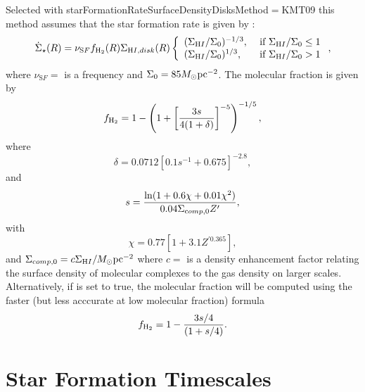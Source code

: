 Selected with {\normalfont \ttfamily starFormationRateSurfaceDensityDisksMethod}$=${\normalfont \ttfamily KMT09} this method assumes that the star formation rate is given by \citep{krumholz_star_2009}:
\begin{equation}
 \dot{\Sigma}_\star(R) = \nu_{\mathrm SF} f_{\mathrm H_2}(R)\Sigma_{\mathrm HI, disk}(R) \left\{ \begin{array}{ll} (\Sigma_{\mathrm HI}/\Sigma_0)^{-1/3}, &  \hbox{ if } \Sigma_{\mathrm HI}/\Sigma_0 \le 1 \\ (\Sigma_{\mathrm HI}/\Sigma_0)^{1/3}, & \hbox{ if } \Sigma_{\mathrm HI}/\Sigma_0 > 1 \end{array} \right. ,
\end{equation}
where $\nu_{\mathrm SF}=${\normalfont \ttfamily [starFormationFrequencyKMT09]} is a frequency and $\Sigma_0=85 M_\odot \hbox{pc}^{-2}$. The molecular fraction is given by
\begin{equation}
 f_{\mathrm H_2} = 1 - \left( 1 + \left[ { 3 s \over 4 (1+\delta)} \right]^{-5} \right)^{-1/5},
\end{equation}
where
\begin{equation}
 \delta = 0.0712 \left[ 0.1 s^{-1} + 0.675 \right]^{-2.8},
\end{equation}
and
\begin{equation}
 s = {\ln(1+0.6\chi+0.01\chi^2) \over 0.04 \Sigma_{\mathrm comp,0} Z^\prime},
\end{equation}
with
\begin{equation}
 \chi = 0.77 \left[ 1 + 3.1 Z^{\prime 0.365} \right],
\end{equation}
and $\Sigma_{\mathrm comp,0}=c \Sigma_{\mathrm HI}/M_\odot \hbox{pc}^{-2}$ where $c=${\normalfont \ttfamily [molecularComplexClumpingFactorKMT09]} is a density enhancement factor relating the surface density of molecular complexes to the gas density on larger scales. Alternatively, if {\normalfont \ttfamily [molecularFractionFastKMT09]} is set to true, the molecular fraction will be computed using the faster (but less acccurate at low molecular fraction) formula
\begin{equation}
 f_{\mathrm H_2} = 1 - { 3s/4 \over (1 + s/4)}.
\end{equation}

\section{Star Formation Timescales}


